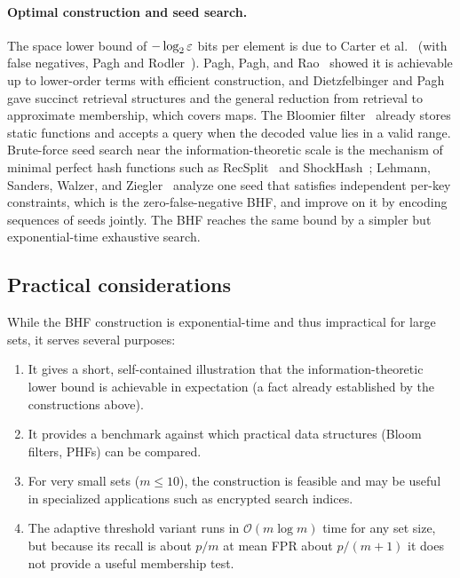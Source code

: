 \paragraph{Optimal construction and seed search.}
The space lower bound of $-\log_2 \varepsilon$ bits per element is due to Carter
et al.~\cite{carter1978} (with false negatives, Pagh and
Rodler~\cite{pagh2001lossy}).
Pagh, Pagh, and Rao~\cite{pagh2005} showed it is achievable up to lower-order
terms with efficient construction, and Dietzfelbinger and
Pagh~\cite{dietzfelbinger2008retrieval} gave succinct retrieval structures and
the general reduction from retrieval to approximate membership, which covers
maps.
The Bloomier filter~\cite{chazelle2004bloomier} already stores static
functions and accepts a query when the decoded value lies in a valid range.
Brute-force seed search near the information-theoretic scale is the
mechanism of minimal perfect hash functions such as
RecSplit~\cite{esposito2020recsplit} and ShockHash~\cite{lehmann2024shockhash};
Lehmann, Sanders, Walzer, and Ziegler~\cite{lehmann2025seeds} analyze one
seed that satisfies independent per-key constraints, which is the
zero-false-negative BHF, and improve on it by encoding sequences of seeds
jointly.
The BHF reaches the same bound by a simpler but exponential-time exhaustive
search.

\subsection{Practical considerations}

While the BHF construction is exponential-time and thus impractical for large
sets, it serves several purposes:
\begin{enumerate}
    \item It gives a short, self-contained illustration that the
    information-theoretic lower bound is achievable in expectation (a fact
    already established by the constructions above).
    \item It provides a benchmark against which practical data structures
    (Bloom filters, PHFs) can be compared.
    \item For very small sets ($m \leq 10$), the construction is feasible and
    may be useful in specialized applications such as encrypted search indices.
    \item The adaptive threshold variant runs in $\mathcal{O}(m \log m)$ time
    for any set size, but because its recall is about $p/m$ at mean FPR about
    $p/(m+1)$ it does not provide a useful membership test.
\end{enumerate}

